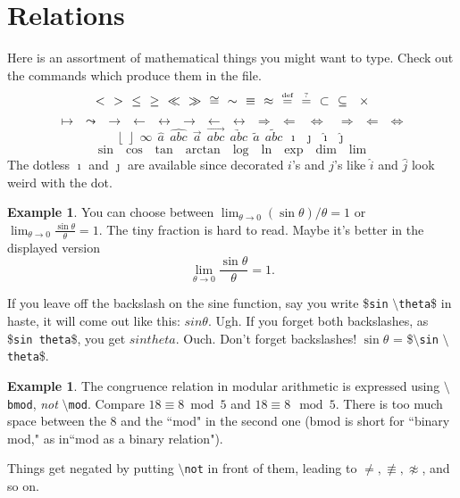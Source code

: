 \documentclass[12pt,letterpaper]{amsart}
\newcommand{\sm}{\setminus}
\newcommand{\pln}[1]{$\sm${\tt #1}}
\theoremstyle{plain}
\theoremstyle{definition}
\newtheorem{example}[theorem]{Example}
\numberwithin{equation}{section}
\begin{document}
\section{Relations}\label{notsec}

Here is an assortment of mathematical things you might want to type. 
Check out the commands which produce them in the file. 
$$
< \ \  > \ \ \leq \ \ \geq \ \ \ll \ \ \gg \ \ 
\cong \ \ \sim \ \ \equiv \ \ \approx \ \ 
\stackrel{\text{\tiny def}}{=} \ \ 
\stackrel{\text{\tiny ?}}{=} \ \ 
\subset \ \ \subseteq \ \ \times  
$$
$$
\mapsto \ \ \leadsto \ \ 
\rightarrow \ \ \leftarrow \ \ 
\leftrightarrow \ \ 
\longrightarrow \ \ \longleftarrow \ \ \longleftrightarrow 
\ \ \Rightarrow \ \ \Leftarrow \ \ \ \Leftrightarrow \ \ 
\ \ \Longrightarrow \ \ \Longleftarrow \ \ \Longleftrightarrow  
$$
$$
\lfloor \ \  \rfloor \ \  
\infty \ \ 
\hat{a} \ \ \widehat{abc} \ \ 
\vec{a} \ \ \overrightarrow{abc} \ \ \underrightarrow{abc} \ \ 
\tilde{a} \ \ \widetilde{abc} \ \ 
\imath \ \ 
\jmath \ \ \hat{\imath} \ \ \hat{\jmath}
$$
$$
\sin \ \ \cos \ \ \tan \ \ \arctan \ \ \log \ \ \ln \ \ \exp \ \ \dim \ \ \lim
$$
The dotless $\imath$ and $\jmath$ are available since 
decorated $i$'s and $j$'s like $\hat{i}$ and $\hat{j}$ look 
weird with the dot.


\begin{example}
You can choose between 
$\lim_{\theta \rightarrow 0} (\sin \theta)/\theta = 1$ or 
$\lim_{\theta \rightarrow 0} \frac{\sin \theta}{\theta} = 1$. 
The tiny fraction is hard to read.  Maybe it's better 
in the displayed version
$$
\lim_{\theta \rightarrow 0} \frac{\sin \theta}{\theta} = 1.
$$
\end{example}

If you leave off the backslash on the sine function, 
say you write 
\${\tt sin} \pln{theta}\$ in haste, it 
will come out like this: $sin \theta$.  Ugh.  If you forget both 
backslashes, as \${\tt sin theta}\$, you get $sin theta$.  Ouch.
Don't forget backslashes! $\sin \theta$ = 
\$\pln{sin} \pln{theta}\$.


\begin{example}
The congruence relation in modular arithmetic is 
expressed using \pln{bmod}, {\it not} \pln{mod}. 
Compare $18 \equiv 8 \bmod 5$ and $18 \equiv 8 \mod 5$.
There is too much space between the 8 and the ``mod" in the second one 
(bmod is short for ``binary mod," as in``mod as a binary relation").
\end{example}


Things get negated by putting \pln{not} in front of them, leading to 
$\not=, \not\equiv, \not\approx$, and so on. 
\end{document}
